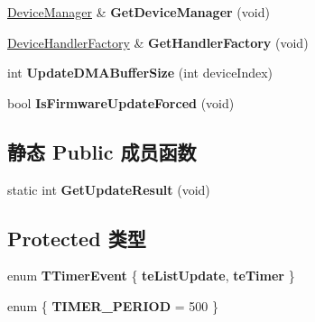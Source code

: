 \begin{DoxyCompactItemize}
\item 
\hypertarget{class_device_configure_frame_ad88192ae8e137c9aa2c33ba9d0a4c0c1}{\hyperlink{classmv_i_m_p_a_c_t_1_1acquire_1_1_device_manager}{Device\+Manager} \& {\bfseries Get\+Device\+Manager} (void)}\label{class_device_configure_frame_ad88192ae8e137c9aa2c33ba9d0a4c0c1}

\item 
\hypertarget{class_device_configure_frame_a27dbdcac4b21564265d553a652e2ae55}{\hyperlink{class_object_factory}{Device\+Handler\+Factory} \& {\bfseries Get\+Handler\+Factory} (void)}\label{class_device_configure_frame_a27dbdcac4b21564265d553a652e2ae55}

\item 
\hypertarget{class_device_configure_frame_a34bceb6f89fc4a4a307e8b9b308a3d22}{int {\bfseries Update\+D\+M\+A\+Buffer\+Size} (int device\+Index)}\label{class_device_configure_frame_a34bceb6f89fc4a4a307e8b9b308a3d22}

\item 
\hypertarget{class_device_configure_frame_a71eea38f81b4c3df7f788ac71ab63495}{bool {\bfseries Is\+Firmware\+Update\+Forced} (void)}\label{class_device_configure_frame_a71eea38f81b4c3df7f788ac71ab63495}

\end{DoxyCompactItemize}
\subsection*{静态 Public 成员函数}
\begin{DoxyCompactItemize}
\item 
\hypertarget{class_device_configure_frame_afe405d7a9d157755792058a193532920}{static int {\bfseries Get\+Update\+Result} (void)}\label{class_device_configure_frame_afe405d7a9d157755792058a193532920}

\end{DoxyCompactItemize}
\subsection*{Protected 类型}
\begin{DoxyCompactItemize}
\item 
\hypertarget{class_device_configure_frame_a23caa9e8ba94413f67465b51d2da50d6}{enum {\bfseries T\+Timer\+Event} \{ {\bfseries te\+List\+Update}, 
{\bfseries te\+Timer}
 \}}\label{class_device_configure_frame_a23caa9e8ba94413f67465b51d2da50d6}

\item 
\hypertarget{class_device_configure_frame_ad70b5ab7a3740c6d78290641bffae8e7}{enum \{ {\bfseries T\+I\+M\+E\+R\+\_\+\+P\+E\+R\+I\+O\+D} = 500
 \}}\label{class_device_configure_frame_ad70b5ab7a3740c6d78290641bffae8e7}

\end{DoxyCompactItemize}
